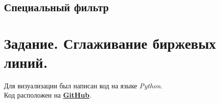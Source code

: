 \documentclass[a5paper, 10pt]{article}
\theoremstyle{definition}
\theoremstyle{plain}
\theoremstyle{remark}
\begin{document}
\newpage
\,
\newpage
\,
\newpage
\subsection{Специальный фильтр}









\newpage
\section{Задание. Сглаживание биржевых линий.}


\newpage
Для визуализации был написан код на языке \textit{Python}. \\
Код расположен на \href{https://github.com/a-nechaeva/practical_Linal/tree/main/lab4}{\textbf{GitHub}}.
\end{document}
